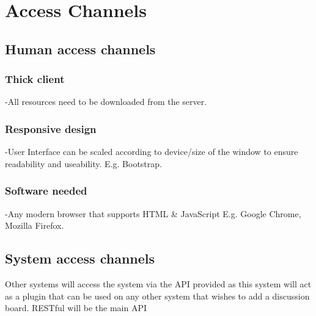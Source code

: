 \section{Access Channels}
\subsection{Human access channels }
\subsubsection{Thick client}
-All resources need to be downloaded from the server.
\subsubsection{Responsive design}
-User Interface can be scaled according to device/size of the window to ensure readability and useability. E.g. Bootstrap.

\subsubsection{Software needed}
-Any modern browser that supports HTML \& JavaScript E.g. Google Chrome, Mozilla Firefox.


\subsection{System access channels }
Other systems will access the system via the API provided as this system will act as a plugin that can be used on any other system that wishes to add a discussion board.
RESTful will be the main API
